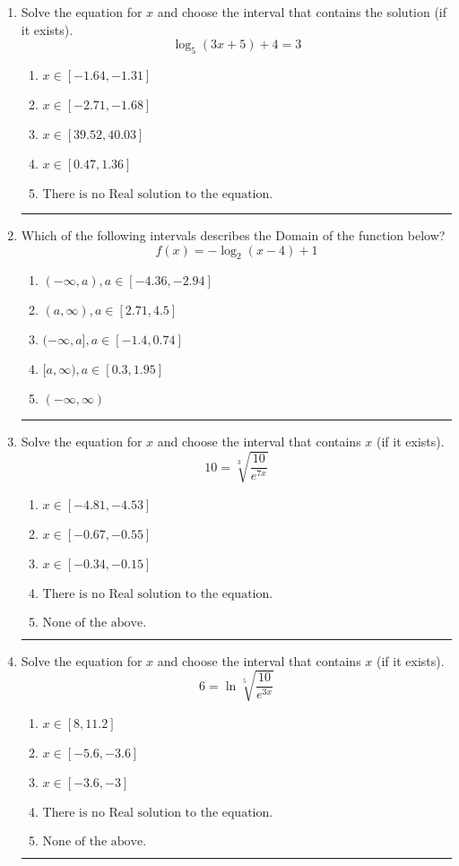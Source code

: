 \documentclass[14pt]{extbook}
\newcommand{\litem}[1]{\item#1\hspace*{-1cm}\rule{\textwidth}{0.4pt}}
\begin{document}
\begin{enumerate}
\litem{
Solve the equation for $x$ and choose the interval that contains the solution (if it exists).\[ \log_{5}{(3x+5)}+4 = 3 \]\begin{enumerate}[label=\Alph*.]
\item \( x \in [-1.64, -1.31] \)
\item \( x \in [-2.71, -1.68] \)
\item \( x \in [39.52, 40.03] \)
\item \( x \in [0.47, 1.36] \)
\item \( \text{There is no Real solution to the equation.} \)

\end{enumerate} }
\litem{
Which of the following intervals describes the Domain of the function below?\[ f(x) = -\log_2{(x-4)}+1 \]\begin{enumerate}[label=\Alph*.]
\item \( (-\infty, a), a \in [-4.36, -2.94] \)
\item \( (a, \infty), a \in [2.71, 4.5] \)
\item \( (-\infty, a], a \in [-1.4, 0.74] \)
\item \( [a, \infty), a \in [0.3, 1.95] \)
\item \( (-\infty, \infty) \)

\end{enumerate} }
\litem{
 Solve the equation for $x$ and choose the interval that contains $x$ (if it exists).\[  10 = \sqrt[3]{\frac{10}{e^{7x}}} \]\begin{enumerate}[label=\Alph*.]
\item \( x \in [-4.81, -4.53] \)
\item \( x \in [-0.67, -0.55] \)
\item \( x \in [-0.34, -0.15] \)
\item \( \text{There is no Real solution to the equation.} \)
\item \( \text{None of the above.} \)

\end{enumerate} }
\litem{
 Solve the equation for $x$ and choose the interval that contains $x$ (if it exists).\[  6 = \ln{\sqrt[5]{\frac{10}{e^{3x}}}} \]\begin{enumerate}[label=\Alph*.]
\item \( x \in [8, 11.2] \)
\item \( x \in [-5.6, -3.6] \)
\item \( x \in [-3.6, -3] \)
\item \( \text{There is no Real solution to the equation.} \)
\item \( \text{None of the above.} \)


\end{enumerate}}
\end{enumerate}
\end{document}
